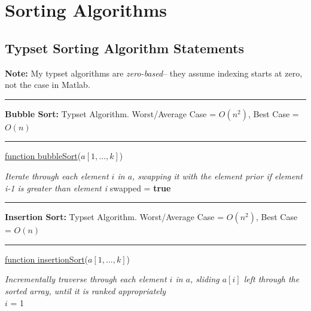 \documentclass[12pt]{extarticle}
\begin{document}
\newpage
\section{Sorting Algorithms}
\subsection{Typset Sorting Algorithm Statements}
\textbf{Note: } My typset algorithms are \textit{zero-based}-- they assume indexing starts at zero, not the case in Matlab.

\vspace{12pt}
\hrule
\vspace{6pt}

\small\textbf{Bubble Sort:} Typset Algorithm. Worst/Average Case = $O(n^2)$, Best Case = $O(n)$ 
\vspace{6pt}
\hrule

\begin{algorithm}[H]

\underline{function bubbleSort}($a[1,...,k]$)

\vspace{6pt}
\BlankLine
\emph{Iterate through each element $i$ in $a$, swapping it with the element prior if element i-1 is greater than element i}
\BlankLine
swapped = \textbf{true}\;
\BlankLine
{}
\vspace{6pt}
\end{algorithm}
\vspace{12pt}
\hrule
\vspace{6pt}
\textbf{Insertion Sort:} Typset Algorithm. Worst/Average Case = $O(n^2)$, Best Case = $O(n)$ 
\vspace{6pt}
\hrule

\begin{algorithm}[H]
\underline{function insertionSort}($a[1,...,k]$)

\vspace{6pt}

\emph{Incrementally traverse through each element $i$ in $a$, sliding $a[i]$ left through the sorted array, until it is ranked appropriately}
\vspace{6pt}\\
$i$ = 1\;
\vspace{6pt}

\end{algorithm}
\end{document}
